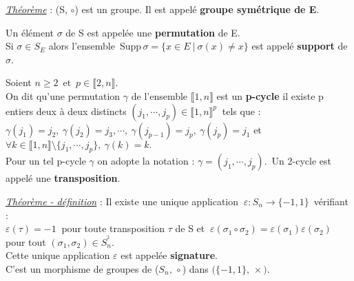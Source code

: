 \vspace{1cm}

\underline{\emph{Théorème}} : (S, \(\circ\)) est un groupe. Il est appelé \textbf{groupe symétrique de E}.

\vspace{1cm}

Un élément \(\sigma\) de S est appelée une \textbf{permutation} de E.\\
Si \(\sigma\in S_E\) alors l'ensemble\, Supp\(\, \sigma =\{x\in E \ \rvert \ \sigma(x)\neq x\}\) est appelé \textbf{support} de \(\sigma\).

\vspace{1cm}

Soient \(n\geq 2\, \text{ et }\, p\in\llbracket 2,n\rrbracket.\)\\
On dit qu'une permutation $\gamma$ de l'ensemble \(\llbracket 1,n\rrbracket\) est un \textbf{p-cycle} \ssi il existe p entiers deux à deux distincts \(\displaystyle(j_1,\cdots,j_p)\in\llbracket 1,n\rrbracket^p\ \) tels que :\vspace{0.1cm}\\
\(\gamma(j_1)=j_2,\ \gamma(j_2)=j_3,\cdots ,\ \gamma(j_{p-1})=j_p,\ \gamma(j_p)=j_1\) et \(\forall k\in \llbracket 1,n\rrbracket\setminus\{j_1,\cdots,j_p\},\ \gamma(k)=k. \)\vspace{0.3cm}\\
Pour un tel p-cycle $\gamma$ on adopte la notation : \(\gamma = (j_1,\cdots,j_p).\,\) Un 2-cycle est appelé une \textbf{transposition}.

\vspace{1.2cm}

\underline{\emph{Théorème - définition}} : Il existe une unique application \(\ \varepsilon : S_n\to \{-1,1\}\,\) vérifiant :\vspace{0.1cm}\\
\(\varepsilon(\tau)=-1\ \) pour toute transposition $\tau$ de S et \(\ \varepsilon(\sigma_1\circ \sigma_2)=\varepsilon(\sigma_1)\varepsilon(\sigma_2)\ \) pour tout \((\sigma_1, \sigma_2)\in S_n^{^2}.\)\vspace{0.1cm}\\
Cette unique application $\varepsilon$ est appelée \textbf{signature}.\vspace{0.1cm}\\
C'est un morphisme de groupes de (\(S_n,\,\circ\)) dans \(\bigl(\{-1,1\},\, \times\bigr)\).

